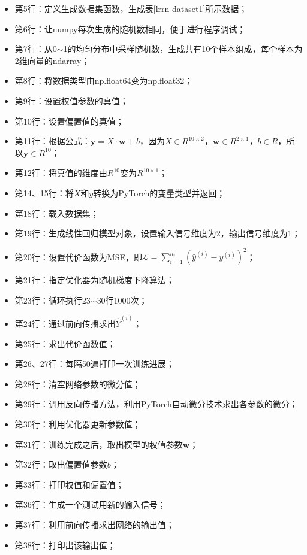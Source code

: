\documentclass[UTF8]{article}
\begin{document}
\begin{itemize}
\item 第5行：定义生成数据集函数，生成表\ref{lrrn-dataset1}所示数据；
\item 第6行：让numpy每次生成的随机数相同，便于进行程序调试；
\item 第7行：从0$\sim$1的均匀分布中采样随机数，生成共有10个样本组成，每个样本为2维向量的ndarray；
\item 第8行：将数据类型由np.float64变为np.float32；
\item 第9行：设置权值参数的真值；
\item 第10行：设置偏置值的真值；
\item 第11行：根据公式：$\boldsymbol{y}=X \cdot \boldsymbol{w} + b$，因为$X \in R^{10 \times 2}$，$\boldsymbol{w} \in R^{2 \times 1}$，$b \in R$，所以$\boldsymbol{y} \in R^{10}$；
\item 第12行：将真值的维度由$R^{10}$变为$R^{10 \times 1}$；
\item 第14、15行：将$X$和$y$转换为PyTorch的变量类型并返回；
\item 第18行：载入数据集；
\item 第19行：生成线性回归模型对象，设置输入信号维度为2，输出信号维度为1；
\item 第20行：设置代价函数为MSE，即$\mathcal{L}=\sum_{i=1}^{m} (\hat{y}^{(i)} - y^{(i)})^{2}$；
\item 第21行：指定优化器为随机梯度下降算法；
\item 第23行：循环执行23$\sim$30行1000次；
\item 第24行：通过前向传播求出$\hat{Y}^{(i)}$；
\item 第25行：求出代价函数值；
\item 第26、27行：每隔50遍打印一次训练进展；
\item 第28行：清空网络参数的微分值；
\item 第29行：调用反向传播方法，利用PyTorch自动微分技术求出各参数的微分；
\item 第30行：利用优化器更新参数值；
\item 第31行：训练完成之后，取出模型的权值参数$\boldsymbol{w}$；
\item 第32行：取出偏置值参数$b$；
\item 第33行：打印权值和偏置值；
\item 第36行：生成一个测试用新的输入信号；
\item 第37行：利用前向传播求出网络的输出值；
\item 第38行：打印出该输出值；
\end{itemize}
\end{document}
